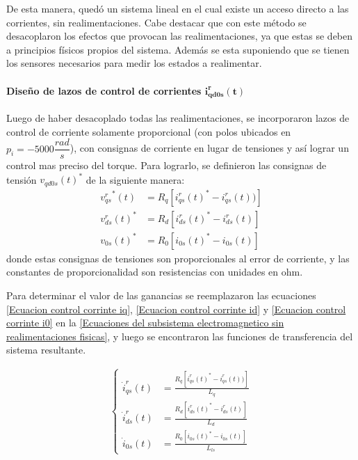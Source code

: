 \documentclass[a4paper, 10pt, onecolumn,journal]{ieeeconf}
\begin{document}
De esta manera, quedó un sistema lineal en el cual existe un acceso directo a las corrientes, sin realimentaciones. Cabe destacar que con este método se desacoplaron los efectos que provocan las realimentaciones, ya que  estas se deben a principios físicos propios del sistema. Además se esta suponiendo que se tienen los sensores necesarios para medir los estados a realimentar.

\paragraph{\textbf{Diseño de lazos de control de corrientes $\mathbf{{i}^r_{qd0s}(t)}$}}
Luego de haber desacoplado todas las realimentaciones, se incorporaron lazos de control de corriente solamente proporcional (con polos ubicados en $p_{i}=-5000\dfrac{rad}{s}$), con consignas de corriente en lugar de tensiones y así lograr un control mas preciso del torque.
Para lograrlo, se definieron las consignas de tensión  ${v_{qd0s}(t)}^*$ de la siguiente manera:
 \begin{align}
	{v^r_{qs}}^*(t) &= R_q \left[ {i^r_{qs}(t)}^* - i^r_{qs}(t))\right] \label{Ecuacion control corrinte iq}\\
	{v^r_{ds}(t)}^* &= R_d \left[ {i^r_{ds}(t)}^* - i^r_{ds}(t) \right] \label{Ecuacion control corrinte id}\\ 
	{v_{0s}(t)}^*   &= R_0 \left[ {i_{0s}(t)}^* - i_{0s}(t) \right] \label{Ecuacion control corrinte i0}
\end{align}
donde estas consignas de tensiones son proporcionales al error de corriente, y las constantes de proporcionalidad son resistencias con unidades en ohm.

Para determinar el valor de las ganancias se reemplazaron las ecuaciones \eqref{Ecuacion control corrinte iq}, \eqref{Ecuacion control corrinte id} y \eqref{Ecuacion control corrinte i0} en la \cref{Ecuaciones del subsistema electromagnetico sin realimentaciones fisicas}, y luego se encontraron las funciones de transferencia del sistema resultante.

\begin{align}
	\begin{cases}
		\dot{i}^r_{qs}(t) &= \frac{ R_q \left[ {i^r_{qs}(t)}^* - i^r_{qs}(t))\right]}{L_q}\\
		\dot{i}^r_{ds}(t) &= \frac{R_d \left[ {i^r_{ds}(t)}^* - i^r_{ds}(t) \right]}{L_d} \\ 
		\dot{i}_{0s}(t)   &= \frac{R_0 \left[ {i_{0s}(t)}^* - i_{0s}(t) \right]}{L_{ls}}
	\end{cases}	\label{Ecuaciones lazos de control de corriente}
\end{align}
\end{document}
